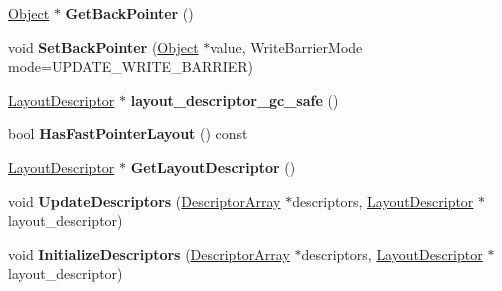 \begin{DoxyCompactItemize}
\item 
\hyperlink{classv8_1_1internal_1_1_object}{Object} $\ast$ {\bfseries Get\+Back\+Pointer} ()\hypertarget{classv8_1_1internal_1_1_map_a1c3bf83707827c566115ec0c80bfc1ed}{}\label{classv8_1_1internal_1_1_map_a1c3bf83707827c566115ec0c80bfc1ed}

\item 
void {\bfseries Set\+Back\+Pointer} (\hyperlink{classv8_1_1internal_1_1_object}{Object} $\ast$value, Write\+Barrier\+Mode mode=U\+P\+D\+A\+T\+E\+\_\+\+W\+R\+I\+T\+E\+\_\+\+B\+A\+R\+R\+I\+ER)\hypertarget{classv8_1_1internal_1_1_map_a50e304739b2086469cde853b8f50c6dd}{}\label{classv8_1_1internal_1_1_map_a50e304739b2086469cde853b8f50c6dd}

\item 
\hyperlink{classv8_1_1internal_1_1_layout_descriptor}{Layout\+Descriptor} $\ast$ {\bfseries layout\+\_\+descriptor\+\_\+gc\+\_\+safe} ()\hypertarget{classv8_1_1internal_1_1_map_a17e8286011dc05c857084aaa75b6c154}{}\label{classv8_1_1internal_1_1_map_a17e8286011dc05c857084aaa75b6c154}

\item 
bool {\bfseries Has\+Fast\+Pointer\+Layout} () const \hypertarget{classv8_1_1internal_1_1_map_aaa7b183dbdade6e7ea851c71bad537c9}{}\label{classv8_1_1internal_1_1_map_aaa7b183dbdade6e7ea851c71bad537c9}

\item 
\hyperlink{classv8_1_1internal_1_1_layout_descriptor}{Layout\+Descriptor} $\ast$ {\bfseries Get\+Layout\+Descriptor} ()\hypertarget{classv8_1_1internal_1_1_map_a64136307cca1480cbe7045fa3177661f}{}\label{classv8_1_1internal_1_1_map_a64136307cca1480cbe7045fa3177661f}

\item 
void {\bfseries Update\+Descriptors} (\hyperlink{classv8_1_1internal_1_1_descriptor_array}{Descriptor\+Array} $\ast$descriptors, \hyperlink{classv8_1_1internal_1_1_layout_descriptor}{Layout\+Descriptor} $\ast$layout\+\_\+descriptor)\hypertarget{classv8_1_1internal_1_1_map_a82adae97fd59c0645781bec7fcff4d3c}{}\label{classv8_1_1internal_1_1_map_a82adae97fd59c0645781bec7fcff4d3c}

\item 
void {\bfseries Initialize\+Descriptors} (\hyperlink{classv8_1_1internal_1_1_descriptor_array}{Descriptor\+Array} $\ast$descriptors, \hyperlink{classv8_1_1internal_1_1_layout_descriptor}{Layout\+Descriptor} $\ast$layout\+\_\+descriptor)\hypertarget{classv8_1_1internal_1_1_map_a6d75d7ffbe8e1edd6c56373e16d5272c}{}\label{classv8_1_1internal_1_1_map_a6d75d7ffbe8e1edd6c56373e16d5272c}


\end{DoxyCompactItemize}
